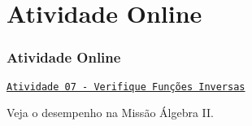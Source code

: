 \section{Atividade Online}
\begin{frame}
\frametitle{Atividade Online} 

\href{https://pt.khanacademy.org/math/algebra2/manipulating-functions/verifying-that-functions-are-inverses/e/inverses_of_functions}
{{\tt Atividade 07 - Verifique Funções Inversas}}


Veja o desempenho na Missão Álgebra II.


\end{frame}